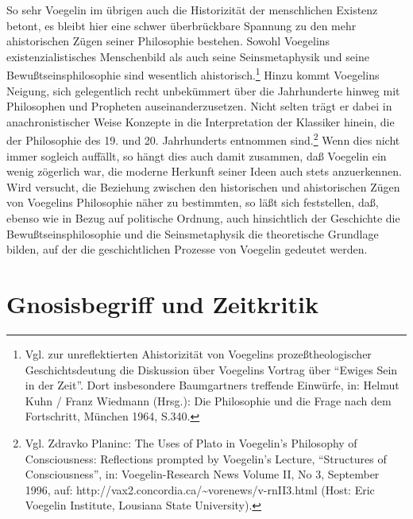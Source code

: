 So sehr Voegelin im übrigen auch die Historizität der menschlichen
Existenz betont, es bleibt hier eine schwer überbrückbare Spannung zu
den mehr ahistorischen Zügen seiner Philosophie bestehen. Sowohl
Voegelins existenzialistisches Menschenbild als auch seine
Seinsmetaphysik und seine Bewußtseinsphilosophie sind wesentlich
ahistorisch.\footnote{Vgl. zur unreflektierten Ahistorizität von
  Voegelins prozeßtheologischer Geschichtsdeutung die Diskussion über
  Voegelins Vortrag über "`Ewiges Sein in der Zeit"'. Dort
  insbesondere Baumgartners treffende Einwürfe, in: Helmut Kuhn /
  Franz Wiedmann (Hrsg.): Die Philosophie und die Frage nach dem
  Fortschritt, München 1964, S.340.} Hinzu kommt Voegelins Neigung,
sich gelegentlich recht unbekümmert über die Jahrhunderte hinweg mit
Philosophen und Propheten auseinanderzusetzen. Nicht selten trägt er
dabei in anachronistischer Weise Konzepte in die Interpretation der
Klassiker hinein, die der Philosophie des 19. und 20.  Jahrhunderts
entnommen sind.\footnote{Vgl. Zdravko Planinc: The Uses of Plato in
  Voegelin's Philosophy of Con\-s\-cious\-ness: Reflections prompted by
  Voegelin's Lecture, "`Structures of Con\-s\-cious\-ness"', in:
  Voegelin-Re\-search News Volume II, No 3, September 1996, auf:
  http:\-//vax2.concordia.ca/\~{ }vorenews/v-rnII3.html (Host: Eric
  Voegelin Institute, Lousiana State University).} Wenn dies nicht
immer sogleich auf\/fällt, so hängt dies auch damit zusammen, daß
Voegelin ein wenig zögerlich war, die moderne Herkunft seiner Ideen
auch stets anzuerkennen. Wird versucht, die Beziehung zwischen den
historischen und ahistorischen Zügen von Voegelins Philosophie näher
zu bestimmten, so läßt sich feststellen, daß, ebenso wie in Bezug auf
politische Ordnung, auch hinsichtlich der Geschichte die
Bewußtseinsphilosophie und die Seinsmetaphysik die theoretische
Grundlage bilden, auf der die geschichtlichen Prozesse von Voegelin
gedeutet werden.

\section{Gnosisbegriff und Zeitkritik}

